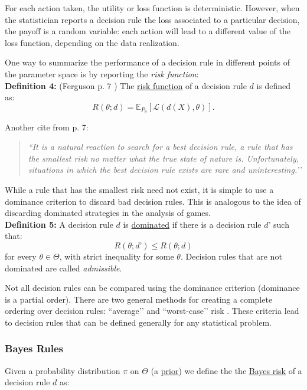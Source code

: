 \documentclass[11pt]{article} %
\begin{document}
For each action taken, the utility or loss function is deterministic. However, when the statistician reports a decision rule the loss associated to a particular decision, the payoff is a random variable: each action will lead to a different value of the loss function, depending on the data realization. 

One way to summarize the performance of a decision rule in different points of the parameter space is by reporting the \emph{risk function}: \\

\noindent \textbf{Definition 4:} (Ferguson p. 7 ) The \underline{risk function} of a decision rule $d$ is defined as:
\[ R(\theta; d) = \mathbb{E}_{P_{\theta}}[\mathcal{L}(d(X),\theta)]. \]

\noindent Another cite from \cite{Ferguson67} p. 7:

\begin{quote}
\emph{``It is a natural reaction to search for a best decision rule, a rule that has the smallest risk no matter what the true state of nature is. Unfortunately, situations in which the best decision rule exists are rare and uninteresting.’’}
\end{quote}

\noindent While a rule that has the smallest risk need not exist, it is simple to use a dominance criterion to discard bad decision rules. This is analogous to the idea of discarding dominated strategies in the analysis of games. \\ 

\noindent \textbf{Definition 5:} A decision rule $d$ is \underline{dominated} if there is a decision rule $d’$ such that:
\[R(\theta;d’) \leq R(\theta;d)\]
for every $\theta \in \Theta$, with strict inequality for some $\theta$. Decision rules that are not dominated are called \emph{admissible}.  

Not all decision rules can be compared using the dominance criterion (dominance is a partial order). There are two general methods for creating a complete ordering over decision rules: ``average’’ and ``worst-case’’ risk . These criteria lead to decision rules that can be defined generally for any statistical problem. 


\subsubsection{Bayes Rules} 

Given a probability distribution $\pi$ on $\Theta$ (a \underline{prior}) we define the the \underline{Bayes risk} of a decision rule $d$ as:
\end{document}
